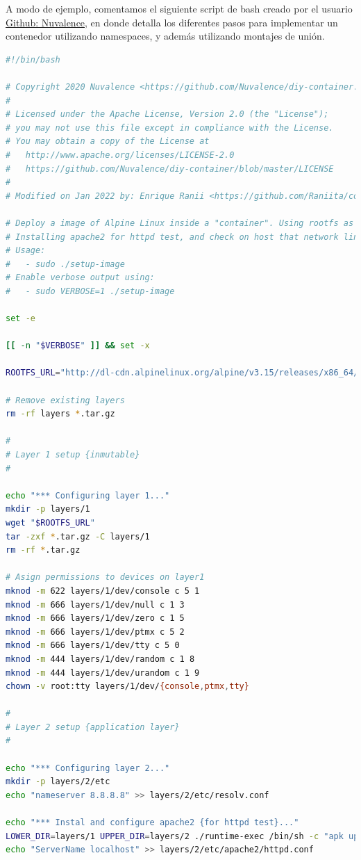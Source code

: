 \documentclass[a4paper, oneside, 12pt]{book}
\begin{document}
	\noindent A modo de ejemplo, comentamos el siguiente script de bash creado por el usuario \href{https://github.com/Nuvalence/diy-container}{Github: Nuvalence}, en donde detalla los diferentes pasos para implementar un contenedor utilizando namespaces, y además utilizando montajes de unión.
	
	\begin{lstlisting}[language=bash, caption={Creación de imagen para contenedor utilizando Alpine y union mounts}]
#!/bin/bash

# Copyright 2020 Nuvalence <https://github.com/Nuvalence/diy-container.git>
# 
# Licensed under the Apache License, Version 2.0 (the "License");
# you may not use this file except in compliance with the License.
# You may obtain a copy of the License at
#   http://www.apache.org/licenses/LICENSE-2.0
#   https://github.com/Nuvalence/diy-container/blob/master/LICENSE
#
# Modified on Jan 2022 by: Enrique Ranii <https://github.com/Raniita/container-alpine.git>

# Deploy a image of Alpine Linux inside a "container". Using rootfs as Union Filesystem
# Installing apache2 for httpd test, and check on host that network link is enabled
# Usage:
#   - sudo ./setup-image
# Enable verbose output using:
#   - sudo VERBOSE=1 ./setup-image

set -e

[[ -n "$VERBOSE" ]] && set -x

ROOTFS_URL="http://dl-cdn.alpinelinux.org/alpine/v3.15/releases/x86_64/alpine-minirootfs-3.15.0-x86_64.tar.gz"

# Remove existing layers
rm -rf layers *.tar.gz

#
# Layer 1 setup {inmutable}
#

echo "*** Configuring layer 1..."
mkdir -p layers/1
wget "$ROOTFS_URL"
tar -zxf *.tar.gz -C layers/1
rm -rf *.tar.gz

# Asign permissions to devices on layer1
mknod -m 622 layers/1/dev/console c 5 1
mknod -m 666 layers/1/dev/null c 1 3
mknod -m 666 layers/1/dev/zero c 1 5
mknod -m 666 layers/1/dev/ptmx c 5 2
mknod -m 666 layers/1/dev/tty c 5 0
mknod -m 444 layers/1/dev/random c 1 8
mknod -m 444 layers/1/dev/urandom c 1 9
chown -v root:tty layers/1/dev/{console,ptmx,tty}

#
# Layer 2 setup {application layer}
#

echo "*** Configuring layer 2..."
mkdir -p layers/2/etc
echo "nameserver 8.8.8.8" >> layers/2/etc/resolv.conf

echo "*** Instal and configure apache2 {for httpd test}..."
LOWER_DIR=layers/1 UPPER_DIR=layers/2 ./runtime-exec /bin/sh -c "apk update && apk add apache2"
echo "ServerName localhost" >> layers/2/etc/apache2/httpd.conf
	\end{lstlisting}
	
\end{document}
